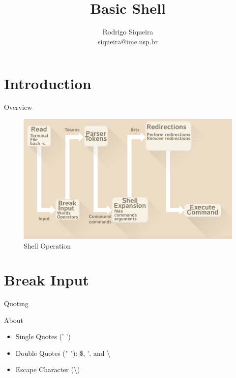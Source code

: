 \documentclass[10pt, compress, aspectratio=169]{beamer}
\title{Basic Shell}
\author{\footnotesize Rodrigo Siqueira \\ {\scriptsize siqueira@ime.usp.br}}
\begin{document}
\maketitle

\section{Introduction}
\begin{frame}{Overview}
  \begin{figure}
    \centering
    \includegraphics[width=\linewidth,
                     height=0.8\textheight,
                     keepaspectratio]{shell_operations}
    \caption{Shell Operation}
  \end{figure}
\end{frame}

\section{Break Input}

\begin{frame}{Quoting}
  \begin{exampleblock}{About}
    \begin{itemize}
      \item Single Quotes (' ')
      \item Double Quotes (" "): \$, ', and \textbackslash
      \item Escape Character (\textbackslash)
    \end{itemize}
  \end{exampleblock}
\end{frame}
\end{document}
